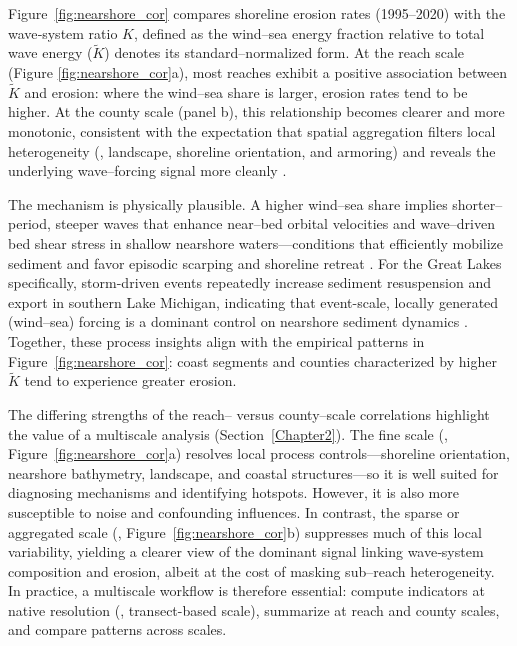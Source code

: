 Figure~\ref{fig:nearshore_cor} compares shoreline erosion rates (1995–2020) with
the wave‐system ratio $K$, defined as the wind–sea energy fraction relative to
total wave energy ($\widetilde{K}$) denotes its standard–normalized form. At the
reach scale (Figure \ref{fig:nearshore_cor}a), most reaches exhibit a positive
association between \(\tilde{K}\) and erosion: where the wind–sea share is
larger, erosion rates tend to be higher. At the county scale (panel b), this
relationship becomes clearer and more monotonic, consistent with the expectation
that spatial aggregation filters local heterogeneity (\eg, landscape, shoreline
orientation, and armoring) and reveals the underlying wave–forcing signal more
cleanly \citep{swenson_bluff_2006}.

The mechanism is physically plausible. A higher wind–sea share implies
shorter–period, steeper waves that enhance near–bed orbital velocities and
wave–driven bed shear stress in shallow nearshore waters—conditions that
efficiently mobilize sediment and favor episodic scarping and shoreline retreat
\citep{voulgaris2000sediment,green2014review}.  For the Great Lakes
specifically, storm-driven events repeatedly increase sediment resuspension and
export in southern Lake Michigan, indicating that event-scale, locally generated
(wind–sea) forcing is a dominant control on nearshore sediment dynamics
\citep{kamphuis1987recession,melby2012wave}. Together, these process insights
align with the empirical patterns in Figure~\ref{fig:nearshore_cor}: coast
segments and counties characterized by higher \(\tilde{K}\) tend to experience
greater erosion. 

The differing strengths of the reach– versus county–scale correlations highlight
the value of a multiscale analysis (Section~\ref{Chapter2}). The fine scale
(\eg, Figure~\ref{fig:nearshore_cor}a) resolves local process controls—shoreline
orientation, nearshore bathymetry, landscape, and coastal structures—so it is
well suited for diagnosing mechanisms and identifying hotspots. However, it is
also more susceptible to noise and confounding influences. In contrast, the
sparse or aggregated scale (\eg, Figure~\ref{fig:nearshore_cor}b) suppresses
much of this local variability, yielding a clearer view of the dominant signal
linking wave‐system composition and erosion, albeit at the cost of masking
sub–reach heterogeneity. In practice, a multiscale workflow is therefore
essential: compute indicators at native resolution (\eg, transect-based scale),
summarize at reach and county scales, and compare patterns across scales.

